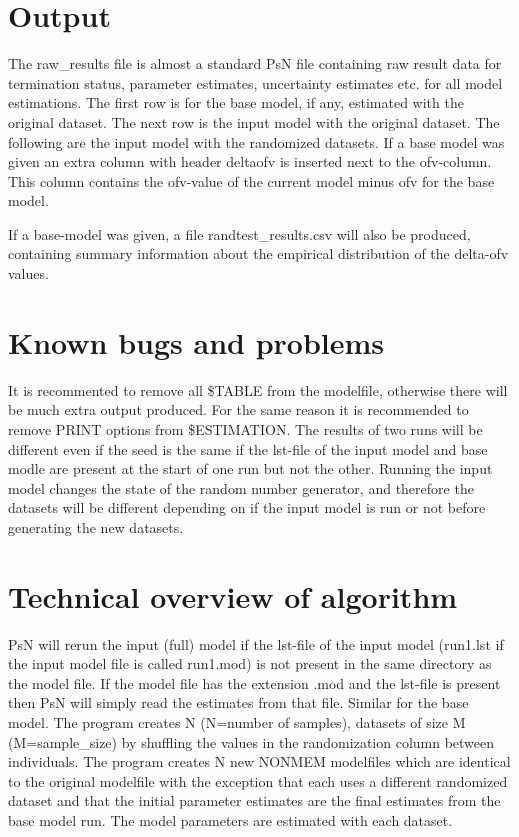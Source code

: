 \section{Output}

The raw\_results file is almost a standard PsN file containing raw result data for termination status, parameter estimates, uncertainty estimates etc. for all model estimations. The first row is for the base model, if any, estimated with the original dataset. The next row is the input model with the original dataset. The following are the input model with the randomized datasets. If a base model was given an extra column with header deltaofv is inserted next to the ofv-column. This column contains the ofv-value of the current model minus ofv for the base model.

If a base-model was given, a file randtest\_results.csv will also be produced, 
containing summary information about the empirical distribution of the
delta-ofv values.


\section{Known bugs and problems}

It is recommented to remove all \$TABLE from the modelfile, otherwise there will be much extra output produced. For the same reason it is recommended to remove PRINT options from \$ESTIMATION. 
The results of two runs will be different even if the seed is the same if the lst-file of the input model and base modle are present at the start of one run but not the other. Running the input model changes the state of the random number generator, and therefore the datasets will be different depending on if the input model is run or not before generating the  new datasets.

\section{Technical overview of algorithm}

PsN will rerun the input (full) model if the lst-file of the input model (run1.lst if the input model file is called run1.mod) is not present in the same directory as the model file. 
If the model file has the extension .mod and the lst-file is present then PsN will simply read the estimates from that file. Similar for the base model.
The program creates N (N=number of samples), datasets of size M (M=sample\_size) by shuffling the values in the randomization column between individuals. The program creates N new NONMEM modelfiles which are identical to the original modelfile with the exception that each uses a different randomized dataset and that the initial parameter estimates are the final estimates from the base model run. The model parameters are estimated with each dataset.


